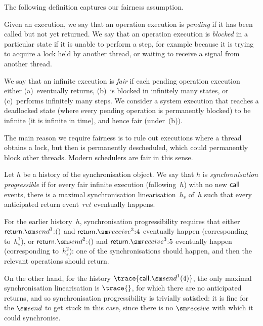 The following definition captures our fairness assumption.
%
\begin{definition}
Given an execution, we say that an operation execution is \emph{pending} if it
has been called but not yet returned.  We say that an operation execution is
\emph{blocked} in a particular state if it is unable to perform a step, for
example because it is trying to acquire a lock held by another thread, or
waiting to receive a signal from another thread.

We say that an infinite execution is \emph{fair} if each pending operation
execution either (a)~eventually returns, (b)~is blocked in infinitely many
states, or (c)~performs infinitely many steps.  We consider a system execution
that reaches a deadlocked state (where every pending operation is permanently
blocked) to be infinite (it is infinite in time), and hence fair (under~(b)).
\end{definition}

The main reason we require fairness is to rule out executions where a thread
obtains a lock, but then is permanently descheduled, which could permanently
block other threads.  Modern schedulers are fair in this sense.


\begin{definition}
Let $h$ be a history of the synchronisation object.  We say that $h$ is
\emph{synchronisation progressible} if for every fair infinite execution
(following~$h$) with no new $\mathsf{call}$ events, there is a maximal synchronisation
linearisation~$h_s$ of~$h$ such that every anticipated return event~$ret$
eventually happens.
\end{definition}





For the earlier history~$h$, synchronisation progressibility
requires that either $\return.\send^1\::()$ and $\return.\receive^3\::4$
eventually happen (corresponding to~$h_s^1$), or $\return.\send^2\::()$ and
$\return.\receive^3\::5$ eventually happen (corresponding to~$h_s^2$): one of
the synchronisations should happen, and then the relevant operations should
return. 

On the other hand, for the history $\trace{\call.\send^1(4)}$, the only
maximal synchronisation linearisation is $\trace{}$, for which there are no
anticipated returns, and so synchronisation progressibility is trivially
satisfied: it is fine for the $\send$ to get stuck in this case, since there
is no $\receive$ with which it could synchronise.
